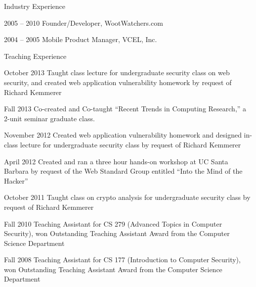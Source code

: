 \begin{vitae}
{\begin{vitaesection}{Industry Experience}
   \item [2005 -- 2010] Founder/Developer, WootWatchers.com

   \item [2004 -- 2005] Mobile Product Manager, VCEL, Inc.

\end{vitaesection}

\begin{vitaesection}{Teaching Experience}
\vspace{-0.1cm}

   \item [October 2013] Taught class lecture for undergraduate
     security class on web security, and created web application
     vulnerability homework by request of Richard Kemmerer

   \item [Fall 2013] Co-created and Co-taught “Recent Trends in
     Computing Research,” a 2-unit seminar graduate class.

   \item [November 2012] Created web application vulnerability
     homework and designed in-class lecture for undergraduate security
     class by request of Richard Kemmerer

   \item [April 2012] Created and ran a three hour hands-on workshop
     at UC Santa Barbara by request of the Web Standard Group entitled
     ``Into the Mind of the Hacker'' 

   \item [October 2011] Taught class on crypto analysis for
     undergraduate security class by request of Richard Kemmerer

   \item [Fall 2010] Teaching Assistant for CS 279 (Advanced Topics in
     Computer Security), won Outstanding Teaching Assistant Award from
     the Computer Science Department


   \item [Fall 2008] Teaching Assistant for CS 177 (Introduction to
     Computer Security), won Outstanding Teaching Assistant Award from
     the Computer Science Department

\end{vitaesection}






}

\end{vitae}
